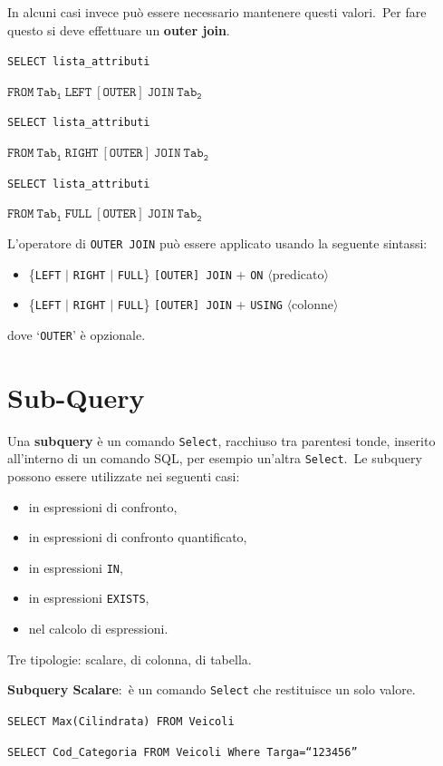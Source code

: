 In alcuni casi invece può essere necessario mantenere questi valori.\
Per fare questo si deve effettuare un \textbf{outer join}.
\begin{flushleft}
	\texttt{SELECT lista\_attributi}

	$\mathtt{FROM\ Tab_1\ LEFT\ [OUTER]\ JOIN\ Tab_2}$
\end{flushleft}
\begin{flushleft}
	\texttt{SELECT lista\_attributi}

	$\mathtt{FROM\ Tab_1\ RIGHT\ [OUTER]\ JOIN\ Tab_2}$
\end{flushleft}
\begin{flushleft}
	\texttt{SELECT lista\_attributi}

	$\mathtt{FROM\ Tab_1\ FULL\ [OUTER]\ JOIN\ Tab_2}$
\end{flushleft}

L'operatore di \texttt{OUTER JOIN} può essere applicato usando la seguente sintassi:
\begin{itemize}
	\item \{\texttt{LEFT} $|$ \texttt{RIGHT} $|$ \texttt{FULL}\} \texttt{[OUTER] JOIN} + \texttt{ON} $\langle$predicato$\rangle$
	\item \{\texttt{LEFT} $|$ \texttt{RIGHT} $|$ \texttt{FULL}\} \texttt{[OUTER] JOIN} + \texttt{USING} $\langle$colonne$\rangle$
\end{itemize}
dove `\texttt{OUTER}' è opzionale.

\section{Sub-Query}

Una \textbf{subquery} è un comando \texttt{Select}, racchiuso tra parentesi tonde, inserito all'interno di un comando SQL, per esempio un'altra \texttt{Select}.\
Le subquery possono essere utilizzate nei seguenti casi:
\begin{itemize}
	\item in espressioni di confronto,
	\item in espressioni di confronto quantificato,
	\item in espressioni \texttt{IN},
	\item in espressioni \texttt{EXISTS},
	\item nel calcolo di espressioni.
\end{itemize}

Tre tipologie: scalare, di colonna, di tabella.\

\noindent \textbf{Subquery Scalare}:\ è un comando \texttt{Select} che restituisce un solo valore.
\begin{flushleft}
	\texttt{SELECT Max(Cilindrata) FROM Veicoli}

	\texttt{SELECT Cod\_Categoria FROM Veicoli Where Targa=``123456''}
\end{flushleft}

